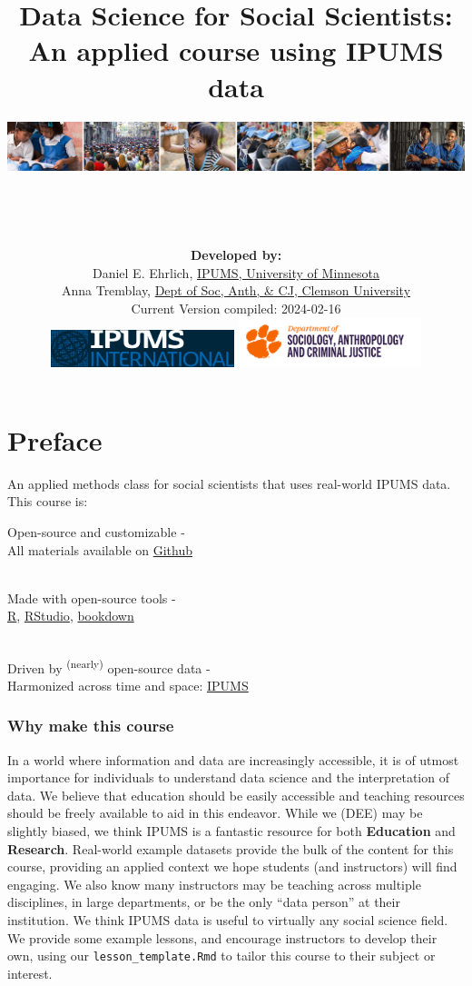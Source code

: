 \documentclass[
]{book}
\title{Data Science for Social Scientists: An applied course using IPUMS data}
\author{\includegraphics{ipums_banner.png}\\
\strut \\
\strut \\
\textbf{Developed by:}\\
\hspace*{0.333em}\hspace*{0.333em}\hspace*{0.333em}Daniel E. Ehrlich, \href{https://international.ipums.org/international/}{IPUMS, University of Minnesota}\\
\hspace*{0.333em}\hspace*{0.333em}\hspace*{0.333em}Anna Tremblay, \href{https://www.clemson.edu/cbshs/departments/sacj/degrees/anthropology.html}{Dept of Soc, Anth, \& CJ, Clemson University}\\
\hspace*{0.333em}\hspace*{0.333em}\hspace*{0.333em}Current Version compiled: 2024-02-16\\
\includegraphics[width=0.4\textwidth,height=\textheight]{ipums_i_logo.jpg} \includegraphics[width=0.4\textwidth,height=\textheight]{clemson_logo.png}\\
}
\date{}
\begin{document}
\maketitle

{
\setcounter{tocdepth}{1}
\tableofcontents
}
\hypertarget{preface}{%
\chapter*{Preface}\label{preface}}

An applied methods class for social scientists that uses real-world IPUMS data. This course is:

Open-source and customizable -\\
\hspace*{0.333em}\hspace*{0.333em}\hspace*{0.333em}All materials available on \href{https://github.com/ehrlichd/ipumsEDbook}{Github}\\
\strut \\
Made with open-source tools -\\
\hspace*{0.333em}\hspace*{0.333em}\href{https://cran.r-project.org/}{R}, \href{https://www.rstudio.com/products/rstudio/}{RStudio}, \href{https://bookdown.org/}{bookdown}\\
\strut \\
Driven by \textsuperscript{(nearly)} open-source data -\\
\hspace*{0.333em}\hspace*{0.333em}Harmonized across time and space: \href{https://ipums.org}{IPUMS}\\

\hypertarget{why-make-this-course}{%
\subsection*{Why make this course}\label{why-make-this-course}}

In a world where information and data are increasingly accessible, it is of utmost importance for individuals to understand data science and the interpretation of data. We believe that education should be easily accessible and teaching resources should be freely available to aid in this endeavor. While we (DEE) may be slightly biased, we think IPUMS is a fantastic resource for both \textbf{Education} and \textbf{Research}. Real-world example datasets provide the bulk of the content for this course, providing an applied context we hope students (and instructors) will find engaging. We also know many instructors may be teaching across multiple disciplines, in large departments, or be the only ``data person'' at their institution. We think IPUMS data is useful to virtually any social science field. We provide some example lessons, and encourage instructors to develop their own, using our \texttt{lesson\_template.Rmd} to tailor this course to their subject or interest.
\end{document}
